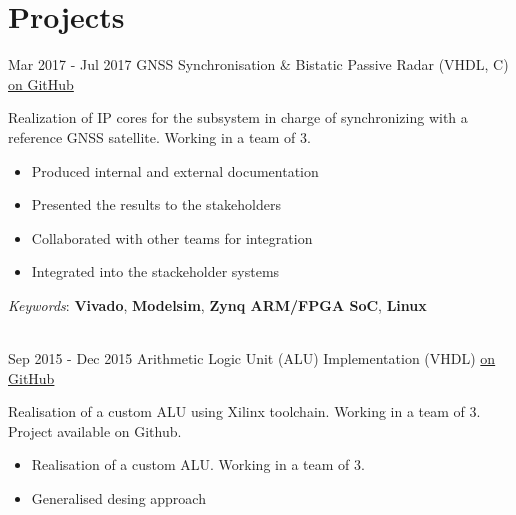 \documentclass[letterpaper]{twentysecondcv} %
\begin{document}
\section{Projects}

\begin{twenty}
	\twentyitem
    	{Mar 2017 -}
		{Jul 2017}
        {GNSS Synchronisation \& Bistatic Passive Radar (VHDL, C)}
        {\href{https://github.com/artic92/sistemi-embedded-task2}{on GitHub}}
        {}
        {
            Realization of IP cores for the subsystem in charge of synchronizing with a reference GNSS satellite. Working in a team of 3.
            \begin{itemize}
                \item Produced internal and external documentation
                \item Presented the results to the stakeholders
                \item Collaborated with other teams for integration
                \item Integrated into the stackeholder systems
		    \end{itemize}
            \textit{Keywords}: \textbf{Vivado}, \textbf{Modelsim}, \textbf{Zynq ARM/FPGA SoC}, \textbf{Linux}
        }\\
	\twentyitem
    	{Sep 2015 -}
		{Dec 2015}
        {Arithmetic Logic Unit (ALU) Implementation (VHDL)}
        {\href{https://github.com/artic92/alu_xilinx}{on GitHub}}
        {}
        {
            Realisation of a custom ALU using Xilinx toolchain. Working in a team of 3.
            Project available on Github.
            \begin{itemize}
                \item Realisation of a custom ALU. Working in a team of 3.
                \item Generalised desing approach

\end{itemize}}
\end{twenty}
\end{document}
